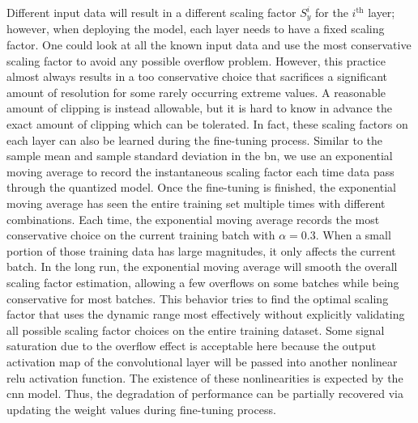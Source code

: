 \documentclass{article}
\begin{document}
Different input data will result in a different scaling factor $S_y^i$ for the $i^\text{th}$ layer; however, when deploying the model, each layer needs to have a fixed scaling factor.
One could look at all the known input data and use the most conservative scaling factor to avoid any possible overflow problem.
However, this practice almost always results in a too conservative choice that sacrifices a significant amount of resolution for some rarely occurring extreme values.
A reasonable amount of clipping is instead allowable, but it is hard to know in advance the exact amount of clipping which can be tolerated.
In fact, these scaling factors on each layer can also be learned during the fine-tuning process.
Similar to the sample mean and sample standard deviation in the \gls{bn}, we use an exponential moving average to record the instantaneous scaling factor each time data pass through the quantized model.
Once the fine-tuning is finished, the exponential moving average has seen the entire training set multiple times with different combinations.
Each time, the exponential moving average records the most conservative choice on the current training batch with $\alpha=0.3$.
When a small portion of those training data has large magnitudes, it only affects the current batch.
In the long run, the exponential moving average will smooth the overall scaling factor estimation, allowing a few overflows on some batches while being conservative for most batches.
This behavior tries to find the optimal scaling factor that uses the dynamic range most effectively without explicitly validating all possible scaling factor choices on the entire training dataset.
Some signal saturation due to the overflow effect is acceptable here because the output activation map of the convolutional layer will be passed into another nonlinear \gls{relu} activation function. 
The existence of these nonlinearities is expected by the \gls{cnn} model. 
Thus, the degradation of performance can be partially recovered via updating the weight values during fine-tuning process.
\end{document}
